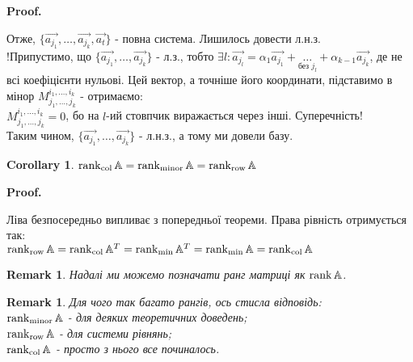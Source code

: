 \documentclass[a4paper, 10pt]{article}
\makeatletter
\theoremstyle{theoremdd}
\newtheorem{remark}[theorem]{Remark}
\newtheorem{corollary}[theorem]{Corollary}
\renewenvironment{proof}[1][Proof.\\]{\par
\pushQED{\hfill \qed}%
\normalfont \topsep6\p@\@plus6\p@\relax
\trivlist
\item\relax
{\bfseries
#1\@addpunct{.}}\hspace\labelsep\ignorespaces
}{%
\popQED\endtrivlist\@endpefalse
}
\makeatother
\begin{document}
\begin{proof}
Отже, $\{\vec{a_{j_1}},\dots,\vec{a_{j_k}}, \vec{a_t}\}$ - повна система. Лишилось довести л.н.з.\\
!Припустимо, що $\{\vec{a_{j_1}},\dots,\vec{a_{j_k}}\}$ - л.з., тобто $\exists l: \vec{a_{j_l}} = \alpha_1 \vec{a_{j_1}} + \underset{\text{без }j_l}{\dots} + \alpha_{k-1} \vec{a_{j_k}}$, де не всі коефіцієнти нульові. Цей вектор, а точніше його координати, підставимо в мінор $M_{j_1,\dots,j_k}^{i_1,\dots,i_k}$ - отримаємо:\\
$M_{j_1,\dots,j_k}^{i_1,\dots,i_k} = 0$, бо на $l$-ий стовпчик виражається через інші. Суперечність!\\
Таким чином, $\{\vec{a_{j_1}},\dots,\vec{a_{j_k}}\}$ - л.н.з., а тому ми довели базу.
\end{proof}

\begin{corollary}
$\rank_{\textrm{col}} \mathbb{A} = \rank_{\textrm{minor}} \mathbb{A} = \rank_{\textrm{row}} \mathbb{A}$
\end{corollary}

\begin{proof}
Ліва безпосередньо випливає з попередньої теореми. Права рівність отримується так:\\
$\rank_{\textrm{row}} \mathbb{A} = \rank_{\textrm{col}} \mathbb{A}^T = \rank_{\textrm{min}} \mathbb{A}^T = \rank_{\textrm{min}} \mathbb{A} = \rank_{\textrm{col}} \mathbb{A}$
\end{proof}

\begin{remark}
Надалі ми можемо позначати ранг матриці як $\rank \mathbb{A}$.
\end{remark}

\begin{remark}
Для чого так багато рангів, ось стисла відповідь:\\
$\rank_{\textrm{minor}} \mathbb{A}$ - для деяких теоретичних доведень;\\
$\rank_{\textrm{row}} \mathbb{A}$ - для системи рівнянь;\\
$\rank_{\textrm{col}} \mathbb{A}$ - просто з нього все починалось.
\end{remark}
\end{document}
